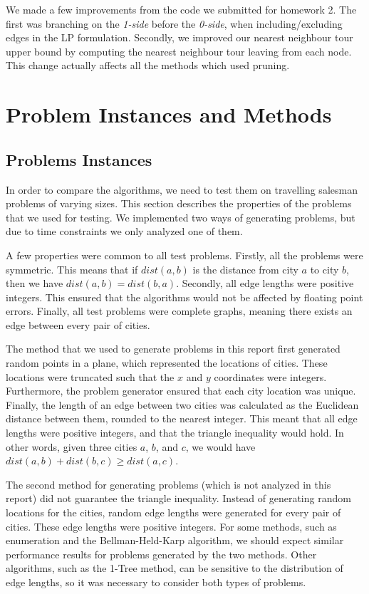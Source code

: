 \documentclass[11pt]{article}
\begin{document}
	We made a few improvements from the code we submitted for homework 2. The first was branching on the \emph{1-side} before the \emph{0-side}, when including/excluding edges in the LP formulation. Secondly, we improved our nearest neighbour tour upper bound by computing the nearest neighbour tour leaving from each node. This change actually affects all the methods which used pruning. 
	
	\section{Problem Instances and Methods}
	\label{sec:methodology}
		
	\subsection{Problems Instances}
	\label{sec:data}
	In order to compare the algorithms, we need to test them on travelling salesman problems of varying sizes. This section describes the properties of the problems that we used for testing. We implemented two ways of generating problems, but due to time constraints we only analyzed one of them.
	
	A few properties were common to all test problems. Firstly, all the problems were symmetric. This means that if $dist(a,b)$ is the distance from city $a$ to city $b$, then we have $dist(a,b) = dist(b,a)$. Secondly, all edge lengths were positive integers. This ensured that the algorithms would not be affected by floating point errors. Finally, all test problems were complete graphs, meaning there exists an edge between every pair of cities.
	
	The method that we used to generate problems in this report first generated random points in a plane, which represented the locations of cities. These locations were truncated such that the $x$ and $y$ coordinates were integers. Furthermore, the problem generator ensured that each city location was unique. Finally, the length of an edge between two cities was calculated as the Euclidean distance between them, rounded to the nearest integer. This meant that all edge lengths were positive integers, and that the triangle inequality would hold. In other words, given three cities $a$, $b$, and $c$, we would have $dist(a,b) + dist(b,c) \geq dist(a,c)$.
	
	The second method for generating problems (which is not analyzed in this report) did not guarantee the triangle inequality. Instead of generating random locations for the cities, random edge lengths were generated for every pair of cities. These edge lengths were positive integers. For some methods, such as enumeration and the Bellman-Held-Karp algorithm, we should expect similar performance results for problems generated by the two methods. Other algorithms, such as the 1-Tree method, can be sensitive to the distribution of edge lengths, so it was necessary to consider both types of problems.
	
\end{document}
